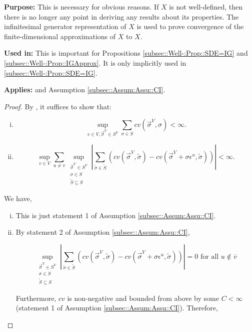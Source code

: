 \documentclass[12pt]{article}
\newcommand{\ov}{\overline}
\newcommand{\te}{\text}
\newcommand{\ep}{\epsilon}
\newcommand{\purpose}{\textbf{Purpose: }}
\newcommand{\usein}{\textbf{Used in: }}
\newcommand{\app}{\textbf{Applies: }}
\renewcommand{\v}{v}							%
\newcommand{\vv}{u}								%
\renewcommand{\S}{S}							%
\newcommand{\s}{\sigma}							%
\newcommand{\sv}{\vec{\s}}						%
\newcommand{\ev}{\ep}							%
\newcommand{\X}{X}								%
\newcommand{\IGr}{c}							%
\newcommand{\vind}[1]{^{#1}}					%
\newcommand{\carp}[1]{^{#1}}					%
\newcommand{\vsi}[1]{^{#1}}						%
\newcommand{\cind}[1]{_{#1}}					%
\newcommand{\cl}{\ov}							%
\newcommand{\const}{C}							%
\renewcommand{\ss}{\tilde{\s}}					%
\renewcommand{\SS}{\tilde{\S}}					%
\begin{document}
\purpose This is necessary for obvious reasons. If \(\X{}{}\) is not well-defined, then there is no longer any point in deriving any results about its properties. The infinitesimal generator representation of \(\X{}{}\) is used to prove convergence of the finite-dimensional approximations of \(\X{}{}\) to \(\X{}{}\).

\usein This is important for Propositions \ref{subsec::Well-:Prop::SDE=IG} and \ref{subsec::Well-:Prop::IGApprox}. It is only implicitly used in \ref{subsec::Well-:Prop::SDE=IG}.

\app \cite[Theorem 3.9]{Lig85} and Assumption \ref{subsec::Assum:Assu::CI}.

\begin{proof}
By \cite[Theorem 3.9 (a) and (b)]{Lig85}, it suffices to show that:

\begin{enumerate}[i)]
\item 

\[\sup_{\v \in V,\sv\cind{}\vsi{V} \in \S\carp{V}} \sum_{\s \in \S} \IGr{\v}(\sv\cind{}\vsi{V},\s) < \infty.\]

\item 

\[\sup_{\v\in V}\sum_{\vv\neq \v} \sup_{\substack{\sv\cind{}\vsi{V} \in \S\carp{V}\\ \s\in \S\\ \SS \subseteq \S}} \left|\sum_{\ss \in \SS} (\IGr{\v}(\sv\cind{}\vsi{V},\ss) - \IGr{\v}(\sv\cind{}\vsi{V}+\s \ev\vind{\vv},\ss))\right| < \infty.\]
\end{enumerate}

We have,

\begin{enumerate}[i)]
\item This is just statement 1 of Assumption \ref{subsec::Assum:Assu::CI}.

\item By statement 2 of Assumption \ref{subsec::Assum:Assu::CI}, 

\[\sup_{\substack{\sv\cind{}\vsi{V} \in \S\carp{V}\\ \s\in \S\\ \SS\subseteq \S}} \left|\sum_{\ss \in \SS} (\IGr{\v}(\sv\cind{}\vsi{V},\ss) - \IGr{\v}(\sv\cind{}\vsi{V}+\s \ev\vind{\vv},\ss))\right| = 0 \te{ for all } \vv \notin \cl{\v}\]

Furthermore, \(\IGr{\v}\) is non-negative and bounded from above by some \(\const{} < \infty\) (statement 1 of Assumption \ref{subsec::Assum:Assu::CI}). Therefore, 


\end{enumerate}
\end{proof}
\end{document}
